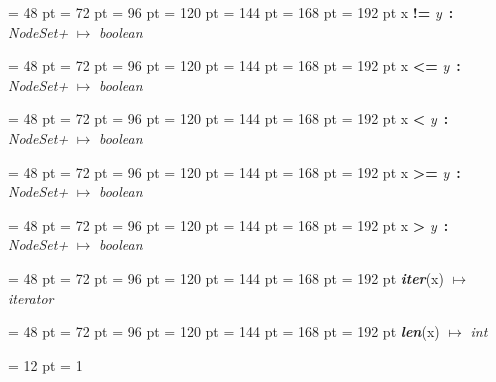 {{{{\par \noindent  \leftskip = 48 pt  \leftmargini = 72 pt  \leftmarginii = 96 pt  \leftmarginiii = 120 pt  \leftmarginiv = 144 pt  \leftmarginv = 168 pt  \leftmarginvi = 192 pt x {\large {\bf !=\/}} {\em y\/}~{\bf :}  {\em NodeSet+\/} \(\mapsto \)  {\em boolean\/}\par}
{\par \noindent  \leftskip = 48 pt  \leftmargini = 72 pt  \leftmarginii = 96 pt  \leftmarginiii = 120 pt  \leftmarginiv = 144 pt  \leftmarginv = 168 pt  \leftmarginvi = 192 pt x {\large {\bf {\textless}=\/}} {\em y\/}~{\bf :}  {\em NodeSet+\/} \(\mapsto \)  {\em boolean\/}\par}
{\par \noindent  \leftskip = 48 pt  \leftmargini = 72 pt  \leftmarginii = 96 pt  \leftmarginiii = 120 pt  \leftmarginiv = 144 pt  \leftmarginv = 168 pt  \leftmarginvi = 192 pt x {\large {\bf {\textless}\/}} {\em y\/}~{\bf :}  {\em NodeSet+\/} \(\mapsto \)  {\em boolean\/}\par}
{\par \noindent  \leftskip = 48 pt  \leftmargini = 72 pt  \leftmarginii = 96 pt  \leftmarginiii = 120 pt  \leftmarginiv = 144 pt  \leftmarginv = 168 pt  \leftmarginvi = 192 pt x {\large {\bf {\textgreater}=\/}} {\em y\/}~{\bf :}  {\em NodeSet+\/} \(\mapsto \)  {\em boolean\/}\par}
{\par \noindent  \leftskip = 48 pt  \leftmargini = 72 pt  \leftmarginii = 96 pt  \leftmarginiii = 120 pt  \leftmarginiv = 144 pt  \leftmarginv = 168 pt  \leftmarginvi = 192 pt x {\large {\bf {\textgreater}\/}} {\em y\/}~{\bf :}  {\em NodeSet+\/} \(\mapsto \)  {\em boolean\/}\par}
{\par \noindent  \leftskip = 48 pt  \leftmargini = 72 pt  \leftmarginii = 96 pt  \leftmarginiii = 120 pt  \leftmarginiv = 144 pt  \leftmarginv = 168 pt  \leftmarginvi = 192 pt  {\em {\large {\bf iter\/}}\/}(x) \(\mapsto \)  {\em iterator\/}\par}
{\par \noindent  \leftskip = 48 pt  \leftmargini = 72 pt  \leftmarginii = 96 pt  \leftmarginiii = 120 pt  \leftmarginiv = 144 pt  \leftmarginv = 168 pt  \leftmarginvi = 192 pt  {\em {\large {\bf len\/}}\/}(x) \(\mapsto \)  {\em int\/}\par}
\par}
\par}
{\par \pagebreak[3.300000] \noindent \hangindent = 12 pt \hangafter = 1 
}}
